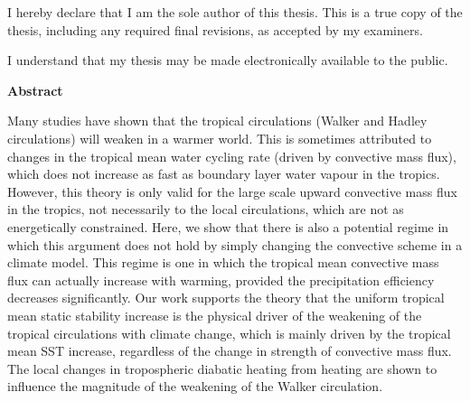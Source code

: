 \cleardoublepage %
 


  \noindent
I hereby declare that I am the sole author of this thesis. This is a true copy of the thesis, including any required final revisions, as accepted by my examiners.

  \bigskip
  
  \noindent
I understand that my thesis may be made electronically available to the public.

\cleardoublepage


\begin{center}\textbf{Abstract}\end{center}

Many studies have shown that the tropical circulations (Walker and Hadley circulations) will weaken in a warmer world. This is sometimes attributed to changes in the tropical mean water cycling rate (driven by convective mass flux), which does not increase as fast as boundary layer water vapour in the tropics. However, this theory is only valid for the large scale upward convective mass flux in the tropics, not necessarily to the local circulations, which are not as energetically constrained. Here, we show that there is also a potential regime in which this argument does not hold by simply changing the convective scheme in a climate model. This regime is one in which the tropical mean convective mass flux can actually increase with warming, provided the precipitation efficiency decreases significantly. Our work supports the theory that the uniform tropical mean static stability increase is the physical driver of the weakening of the tropical circulations with climate change, which is mainly driven by the tropical mean SST increase, regardless of the change in strength of convective mass flux. The local changes in tropospheric diabatic heating from heating are shown to influence the magnitude of the weakening of the Walker circulation.

